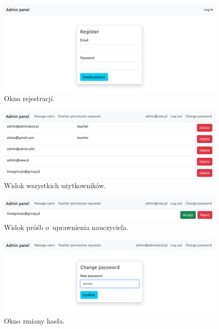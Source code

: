 \documentclass[a4paper,twoside,12pt]{book}
\begin{document}
\begin{figure}[]
\centering
\includegraphics[width=\textwidth]{adminpanel/register}
\caption{Okno rejestracji.}
\label{fig:register}
\end{figure}

\begin{figure}[]
\centering
\includegraphics[width=\textwidth]{adminpanel/dashboard}
\caption{Widok wszystkich użytkowników.}
\label{fig:dashboard}
\end{figure}

\begin{figure}[]
\centering
\includegraphics[width=\textwidth]{adminpanel/requests}
\caption{Widok próśb o~uprawnienia nauczyciela.}
\label{fig:requests}
\end{figure}

\begin{figure}[]
\centering
\includegraphics[width=\textwidth]{adminpanel/changepwd}
\caption{Okno zmiany hasła.}
\label{fig:changepwd}
\end{figure}
\end{document}

